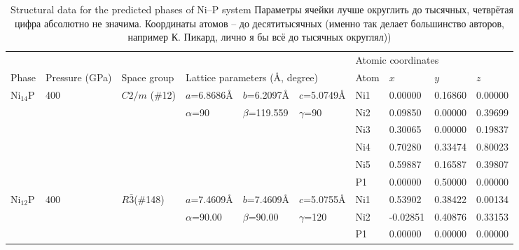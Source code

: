 \documentclass[twoside,twocolumn,9pt]{article}
\begin{document}
\begin{table}[t]
\small
  \caption{\ Structural data for the predicted phases of Ni--P system Параметры ячейки лучше округлить до тысячных, четврётая цифра абсолютно не значима. Координаты атомов – до десятитысячных (именно так делает большинство авторов, например К. Пикард, лично я бы всё до тысячных округлял)) }
  \label{tbl:new_phases}
  \begin{tabular*}{\textwidth}{@{\extracolsep{\fill}}llllllllll}
    \hline
    \multicolumn{6}{l}{} & \multicolumn{4}{l}{Atomic coordinates}\\\cline{7-10}
    Phase & Pressure (GPa) & Space group & \multicolumn{3}{l}{Lattice parameters (\AA, degree)}  & Atom & $x$ & $y$ & $z$\\
    \midrule
    Ni$_{14}$P & 400 & $C2/m$ (\#12) & $a$=6.8686\AA    & $b$=6.2097\AA   & $c$=5.0749\AA    & Ni1 & 0.00000 & 0.16860 & 0.00000 \\
               &     &               & $\alpha$=90      & $\beta$=119.559 & $\gamma$=90      & Ni2 & 0.09850 & 0.00000 & 0.39699 \\    
               &     &               &                  &                 &                  & Ni3 & 0.30065 & 0.00000 & 0.19837 \\
               &     &               &                  &                 &                  & Ni4 & 0.70280 & 0.33474 & 0.80023 \\
               &     &               &                  &                 &                  & Ni5 & 0.59887 & 0.16587 & 0.39807 \\
               &     &               &                  &                 &                  & P1  & 0.00000 & 0.50000 & 0.00000 \\
\midrule
    Ni$_{12}$P & 400 & $R\bar3$(\#148)    & $a$=7.4609\AA    & $b$=7.4609\AA   & $c$=5.0755\AA    & Ni1 & 0.53902  & 0.38422 & 0.00134 \\
               &     &               & $\alpha$=90.00   & $\beta$=90.00 & $\gamma$=120       & Ni2 & -0.02851 & 0.40876 & 0.33153 \\
               &     &               &                  &                 &                  & P1  & 0.00000  & 0.00000 & 0.00000 \\

\end{tabular*}
\end{table}
\end{document}

